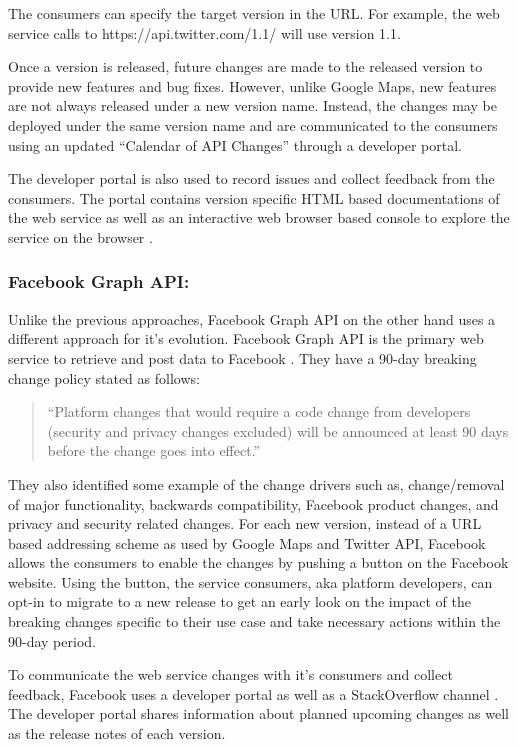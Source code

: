 \documentclass[runningheads,a4paper]{llncs}
\begin{document}
The consumers can specify the target version in the URL. For example, the web service calls to https://api.twitter.com/1.1/ will use version 1.1.

Once a version is released, future changes are made to the released version to provide new features and bug fixes. However, unlike Google Maps, new features are not always released under a new version name. Instead, the changes may be deployed under the same version name and are communicated to the consumers using an updated “Calendar of API Changes” \cite{twitter_calendar} through a developer portal.

The developer portal is also used to record issues and collect feedback from the consumers. The portal contains version specific HTML based documentations of the web service as well as an interactive web browser based console to explore the service on the browser \cite{twitter_console} .

\subsubsection{Facebook Graph API:}

Unlike the previous approaches, Facebook Graph API on the other hand uses a different approach for it’s evolution. Facebook Graph API is the primary web service to retrieve and post data to Facebook \cite{facebook_api}. They have a 90-day breaking change policy stated as follows:

\begin{quote}
``Platform changes that would require a code change from developers (security and privacy changes excluded) will be announced at least 90 days before the change goes into effect.''
\end{quote}

They also identified some example of the change drivers such as, change/removal of major functionality, backwards compatibility, Facebook product changes, and privacy and security related changes. For each new version, instead of a URL based addressing scheme as used by Google Maps and Twitter API, Facebook allows the consumers to enable the changes by pushing a button on the Facebook website. Using the button, the service consumers, aka platform developers, can opt-in to migrate to a new release to get an early look on the impact of the breaking changes specific to their use case and take necessary actions within the 90-day period.

To communicate the web service changes with it’s consumers and collect feedback, Facebook uses a developer portal as well as a StackOverflow channel \cite{facebook_stack_overflow}. The developer portal shares information about planned upcoming changes as well as the release notes of each version.
\end{document}
